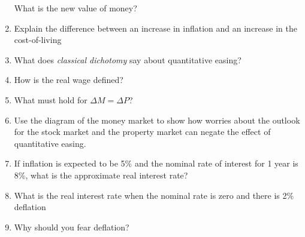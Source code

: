 \documentclass{article}
\begin{document}
\begin{enumerate}
What is the new value of money?

\item Explain the difference between an increase in inflation and an increase in the cost-of-living

\item What does \emph{classical dichotomy} say about quantitative easing? 

\item How is the real wage defined? 

\item What must hold for $\Delta M = \Delta P$?

\item Use the diagram of the money market to show how worries about the outlook for the stock market and the property market can negate the effect of quantitative easing. 

\item If inflation is expected to be 5\% and the nominal rate of interest for 1 year is 8\%, what is the approximate real interest rate? 

\item What is the real interest rate when the nominal rate is zero and there is 2\% deflation

\item Why should you fear deflation? 

\end{enumerate}
\end{document}
